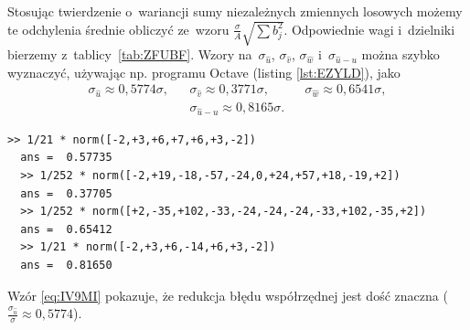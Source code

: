 \documentclass[paper=a4,DIV=12]{tmmlab}
\begin{document}
\begin{appendices}
  Stosując twierdzenie o~wariancji sumy niezależnych zmiennych losowych możemy
  te odchylenia średnie obliczyć ze~wzoru $\tfrac{\sigma}{A}\sqrt{\sum{b_j^2}}$.
  Odpowiednie wagi i~dzielniki bierzemy z~tablicy~\ref{tab:ZFUBF}. Wzory
  na~$\sigma_{\hat{u}}$, $\sigma_{\hat{v}}$, $\sigma_{\hat{w}}$
  i~$\sigma_{\hat{u}-u}$ można szybko wyznaczyć, używając np. programu Octave
  (listing \ref{lst:EZYLD}), jako
  \begin{subequations}
    \label{eq:IV9MI}
    \begin{align}
      & \sigma_{\hat{u}} \approx 0,5774 \sigma, &
      & \sigma_{\hat{v}} \approx 0,3771 \sigma, &
      & \sigma_{\hat{w}} \approx 0,6541 \sigma, &
      \label{eq:DLNXC}
      \\
      &&
      & \sigma_{\hat{u}-u} \approx 0,8165 \sigma. &
      &&
      \label{eq:DKRN7}
    \end{align}
  \end{subequations}
  \begin{lstfloat}
  \begin{lstlisting}[caption={Wyznaczanie współczynników dla wzorów~\eqref{eq:IV9MI}},label={lst:EZYLD}]
  >> 1/21 * norm([-2,+3,+6,+7,+6,+3,-2])
  ans =  0.57735
  >> 1/252 * norm([-2,+19,-18,-57,-24,0,+24,+57,+18,-19,+2])
  ans =  0.37705
  >> 1/252 * norm([+2,-35,+102,-33,-24,-24,-24,-33,+102,-35,+2])
  ans =  0.65412
  >> 1/21 * norm([-2,+3,+6,-14,+6,+3,-2])
  ans =  0.81650
  \end{lstlisting}
  \end{lstfloat}
  Wzór \eqref{eq:IV9MI} pokazuje, że redukcja błędu współrzędnej jest dość
  znaczna ($\tfrac{\sigma_{\hat{u}}}{\sigma} \approx 0,5774$).


\end{appendices}
\end{document}
